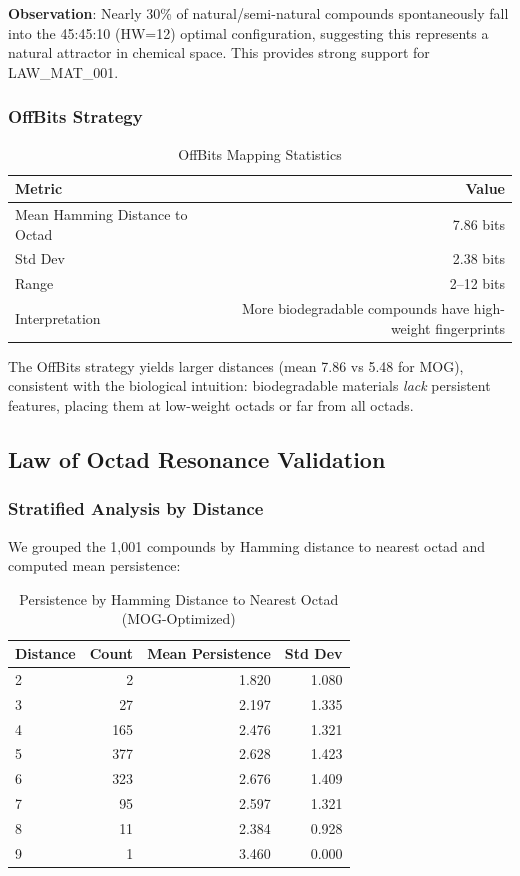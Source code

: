 \documentclass[11pt,letterpaper]{article}
\begin{document}
\textbf{Observation}: Nearly 30\% of natural/semi-natural compounds spontaneously fall into the 45:45:10 (HW=12) optimal configuration, suggesting this represents a natural attractor in chemical space. This provides strong support for LAW\_MAT\_001.

\subsubsection{OffBits Strategy}

\begin{table}[H]
\centering
\caption{OffBits Mapping Statistics}
\begin{tabular}{lr}
\toprule
\textbf{Metric} & \textbf{Value} \\
\midrule
Mean Hamming Distance to Octad & 7.86 bits \\
Std Dev & 2.38 bits \\
Range & 2--12 bits \\
Interpretation & More biodegradable compounds have high-weight fingerprints \\
\bottomrule
\end{tabular}
\end{table}

The OffBits strategy yields larger distances (mean 7.86 vs 5.48 for MOG), consistent with the biological intuition: biodegradable materials \emph{lack} persistent features, placing them at low-weight octads or far from all octads.

\subsection{Law of Octad Resonance Validation}

\subsubsection{Stratified Analysis by Distance}

We grouped the 1,001 compounds by Hamming distance to nearest octad and computed mean persistence:

\begin{table}[H]
\centering
\caption{Persistence by Hamming Distance to Nearest Octad (MOG-Optimized)}
\begin{tabular}{lrrr}
\toprule
\textbf{Distance} & \textbf{Count} & \textbf{Mean Persistence} & \textbf{Std Dev} \\
\midrule
2 & 2 & 1.820 & 1.080 \\
3 & 27 & 2.197 & 1.335 \\
4 & 165 & 2.476 & 1.321 \\
5 & 377 & 2.628 & 1.423 \\
6 & 323 & 2.676 & 1.409 \\
7 & 95 & 2.597 & 1.321 \\
8 & 11 & 2.384 & 0.928 \\
9 & 1 & 3.460 & 0.000 \\
\bottomrule
\end{tabular}
\end{table}
\end{document}
